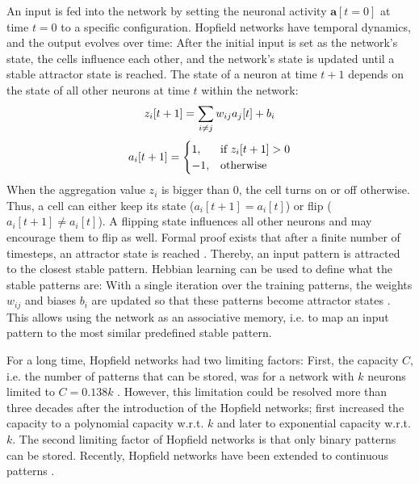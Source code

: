 An input is fed into the network by setting the neuronal activity $\boldsymbol{a}[t=0]$ at time $t=0$ to a specific configuration.
Hopfield networks have temporal dynamics, and the output evolves over time: After the initial input is set as the network's state, the cells influence each other, and the network's state is updated until a stable attractor state is reached.
The state of a neuron at time $t+1$ depends on the state of all other neurons at time $t$ within the network:
%
\begin{align}\eqlbl{hf_1}
	z_i[t+1] = \sum_{i \neq j} w_{ij} a_j[t] + b_i
\end{align}
%
\begin{align}\eqlbl{hf_2}
	a_i[t+1] = \begin{cases}
      		1, & \text{if } z_i[t+1] > 0 \\
      		-1, & \text{otherwise}
    	\end{cases}
\end{align}
%
When the aggregation value $z_i$ is bigger than $0$, the cell turns on or off otherwise.
Thus, a cell can either keep its state ($a_i[t+1] = a_i[t]$) or flip ($a_i[t+1] \neq a_i[t]$).
A flipping state influences all other neurons and may encourage them to flip as well.
Formal proof exists that after a finite number of timesteps, an attractor state is reached .
Thereby, an input pattern is attracted to the closest stable pattern.
Hebbian learning  can be used to define what the stable patterns are:
With a single iteration over the training patterns, the weights $w_{ij}$ and biases $b_i$ are updated so that these patterns become attractor states .
This allows using the network as an associative memory, i.e. to map an input pattern to the most similar predefined stable pattern.

For a long time, Hopfield networks had two limiting factors: First, the capacity $C$, i.e. the number of patterns that can be stored, was for a network with $k$ neurons limited to $C=0.138k$ .
However, this limitation could be resolved more than three decades after the introduction of the Hopfield networks; 
 first increased the capacity to a polynomial capacity w.r.t. $k$ and  later to exponential capacity w.r.t. $k$.
The second limiting factor of Hopfield networks is that only binary patterns can be stored.
Recently, Hopfield networks have been extended to continuous patterns .

